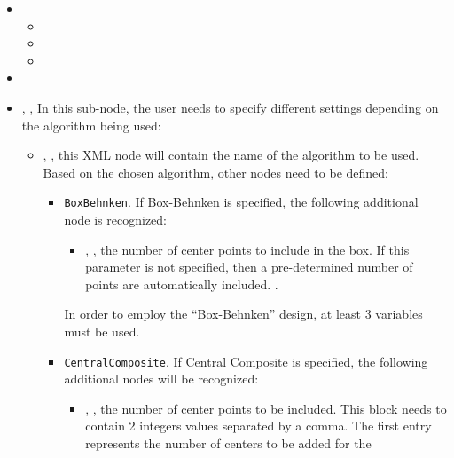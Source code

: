 \begin{itemize}
\item \variableDescription
 \variableChildrenIntro
 \begin{itemize}
    \item \distributionDescription
    \item \functionDescription
     \item \gridDescriptionOnlyCustom
 \end{itemize}
 \item \constantVariablesDescription
\item {}, ,
In this sub-node, the user needs to specify different settings depending on the
algorithm being used:
 \begin{itemize}
  \item {}, , this XML node
    will contain the name of the algorithm to be used.
    Based on the chosen algorithm, other nodes need to be defined:
    \begin{itemize}
      \item {}\texttt{BoxBehnken}. If Box-Behnken
        is specified, the following additional node is recognized:
     \begin{itemize}
      \item {}, , the
        number of center points to include in the box.
        If this parameter is not specified, then a pre-determined number of
        points are automatically included.
        .
     \end{itemize}
     \nb In order to employ the ``Box-Behnken'' design, at least 3 variables
     must be used.
     \item {}\texttt{CentralComposite}. If
       Central Composite is specified, the following additional nodes will
       be recognized:
     \begin{itemize}
      \item {}, , the number of center points to be included.
        This block needs to contain 2 integers values separated by a comma.
        The first entry represents the number of centers to be added for the

\end{itemize}
\end{itemize}
\end{itemize}
\end{itemize}
